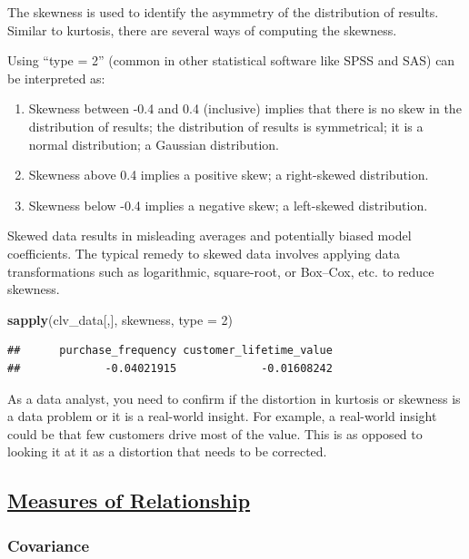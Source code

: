 \documentclass[
]{article}
\newenvironment{Shaded}{\begin{snugshade}}{\end{snugshade}}
\newcommand{\AttributeTok}[1]{\textcolor[rgb]{0.13,0.29,0.53}{#1}}
\newcommand{\DecValTok}[1]{\textcolor[rgb]{0.00,0.00,0.81}{#1}}
\newcommand{\FunctionTok}[1]{\textcolor[rgb]{0.13,0.29,0.53}{\textbf{#1}}}
\newcommand{\NormalTok}[1]{#1}
\begin{document}
The skewness is used to identify the asymmetry of the distribution of
results. Similar to kurtosis, there are several ways of computing the
skewness.

Using ``type = 2'' (common in other statistical software like SPSS and
SAS) can be interpreted as:

\begin{enumerate}
\def\labelenumi{\arabic{enumi}.}
\item
  Skewness between -0.4 and 0.4 (inclusive) implies that there is no
  skew in the distribution of results; the distribution of results is
  symmetrical; it is a normal distribution; a Gaussian distribution.
\item
  Skewness above 0.4 implies a positive skew; a right-skewed
  distribution.
\item
  Skewness below -0.4 implies a negative skew; a left-skewed
  distribution.
\end{enumerate}

Skewed data results in misleading averages and potentially biased model
coefficients. The typical remedy to skewed data involves applying data
transformations such as logarithmic, square-root, or Box--Cox, etc. to
reduce skewness.

\begin{Shaded}
\begin{Highlighting}[]
\FunctionTok{sapply}\NormalTok{(clv\_data[,], skewness, }\AttributeTok{type =} \DecValTok{2}\NormalTok{)}
\end{Highlighting}
\end{Shaded}

\begin{verbatim}
##      purchase_frequency customer_lifetime_value 
##             -0.04021915             -0.01608242
\end{verbatim}

As a data analyst, you need to confirm if the distortion in kurtosis or
skewness is a data problem or it is a real-world insight. For example, a
real-world insight could be that few customers drive most of the value.
This is as opposed to looking it at it as a distortion that needs to be
corrected.

\subsection{\texorpdfstring{\ul{\textbf{Measures of
Relationship}}}{Measures of Relationship}}\label{measures-of-relationship}

\subsubsection{\texorpdfstring{\textbf{Covariance}}{Covariance}}\label{covariance}
\end{document}
